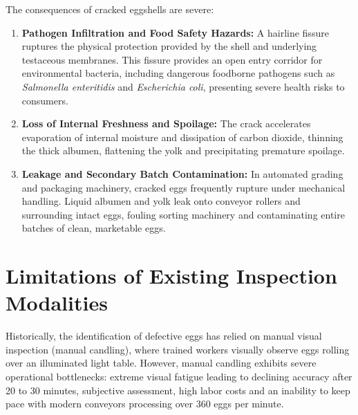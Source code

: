 \documentclass[12pt,a4paper]{report}
\begin{document}
The consequences of cracked eggshells are severe:
\begin{enumerate}[label=\arabic*.]

    \item \textbf{Pathogen Infiltration and Food Safety Hazards:} A hairline fissure ruptures the physical protection provided by the shell and underlying testaceous membranes. This fissure provides an open entry corridor for environmental bacteria, including dangerous foodborne pathogens such as \textit{Salmonella enteritidis} and \textit{Escherichia coli}, presenting severe health risks to consumers.

    \item \textbf{Loss of Internal Freshness and Spoilage:} The crack accelerates evaporation of internal moisture and dissipation of carbon dioxide, thinning the thick albumen, flattening the yolk and precipitating premature spoilage.

    \item \textbf{Leakage and Secondary Batch Contamination:} In automated grading and packaging machinery, cracked eggs frequently rupture under mechanical handling. Liquid albumen and yolk leak onto conveyor rollers and surrounding intact eggs, fouling sorting machinery and contaminating entire batches of clean, marketable eggs.

\end{enumerate}

\section{Limitations of Existing Inspection Modalities}

Historically, the identification of defective eggs has relied on manual visual inspection (manual candling), where trained workers visually observe eggs rolling over an illuminated light table. However, manual candling exhibits severe operational bottlenecks: extreme visual fatigue leading to declining accuracy after 20 to 30 minutes, subjective assessment, high labor costs and an inability to keep pace with modern conveyors processing over 360 eggs per minute.
\end{document}
